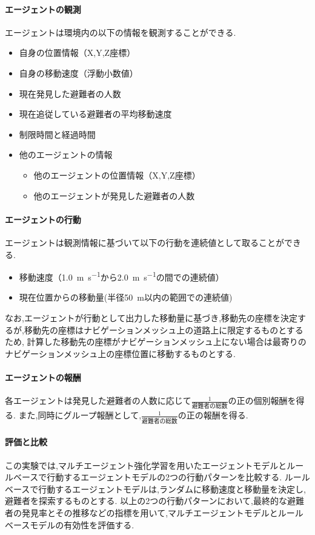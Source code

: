\paragraph{エージェントの観測}
エージェントは環境内の以下の情報を観測することができる.
\begin{itemize}
  \item 自身の位置情報（X,Y,Z座標）
  \item 自身の移動速度（浮動小数値）
  \item 現在発見した避難者の人数
  \item 現在追従している避難者の平均移動速度
  \item 制限時間と経過時間
  \item 他のエージェントの情報
  \begin{itemize}
    \item 他のエージェントの位置情報（X,Y,Z座標）
    \item 他のエージェントが発見した避難者の人数
  \end{itemize} 
\end{itemize}

\paragraph{エージェントの行動}
エージェントは観測情報に基づいて以下の行動を連続値として取ることができる.
\begin{itemize}
  \item 移動速度（\SI{1.0}{\meter\per\second}から\SI{2.0}{\meter\per\second}の間での連続値）
  \item 現在位置からの移動量(半径\SI{50}{\meter}以内の範囲での連続値)
\end{itemize}
なお,エージェントが行動として出力した移動量に基づき,移動先の座標を決定するが,移動先の座標はナビゲーションメッシュ上の道路上に限定するものとするため,
計算した移動先の座標がナビゲーションメッシュ上にない場合は最寄りのナビゲーションメッシュ上の座標位置に移動するものとする.

\paragraph{エージェントの報酬}
各エージェントは発見した避難者の人数に応じて$\frac{1}{避難者の総数}$の正の個別報酬を得る.
また,同時にグループ報酬として,$\frac{1}{避難者の総数}$の正の報酬を得る.

\paragraph{評価と比較}
この実験では,マルチエージェント強化学習を用いたエージェントモデルとルールベースで行動するエージェントモデルの2つの行動パターンを比較する.
ルールベースで行動するエージェントモデルは,ランダムに移動速度と移動量を決定し,避難者を探索するものとする.
以上の2つの行動パターンにおいて,最終的な避難者の発見率とその推移などの指標を用いて,マルチエージェントモデルとルールベースモデルの有効性を評価する.

